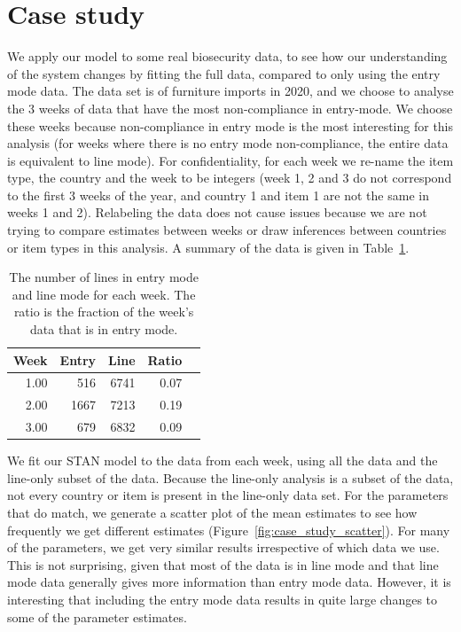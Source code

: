 \documentclass{article}
\begin{document}
\section{Case study}
We apply our model to some real biosecurity data, to see how our understanding of the system changes by fitting the full data, compared to only using the entry mode data. The data set is of furniture imports in 2020, and we choose to analyse the 3 weeks of data that have the most non-compliance in entry-mode. We choose these weeks because non-compliance in entry mode is the most interesting for this analysis (for weeks where there is no entry mode non-compliance, the entire data is equivalent to line mode). For confidentiality, for each week we re-name the item type, the country and the week to be integers (week 1, 2 and 3 do not correspond to the first 3 weeks of the year, and country 1 and item 1 are not the same in weeks 1 and 2). Relabeling the data does not cause issues because we are not trying to compare estimates between weeks or draw inferences between countries or item types in this analysis. A summary of the data is given in Table~\ref{tab:real_data_summary}.

\begin{table}[ht]
\caption{The number of lines in entry mode and line mode for each week. The ratio is the fraction of the week's data that is in entry mode.}
\label{tab:real_data_summary}
\centering
\begin{tabular}{rrrrr}
  \hline
 Week & Entry & Line & Ratio \\ 
  \hline
 1.00 & 516 & 6741 & 0.07 \\ 
  2.00 & 1667 & 7213 & 0.19 \\ 
   3.00 & 679 & 6832 & 0.09 \\ 
   \hline
\end{tabular}
\end{table}


We fit our STAN model to the data from each week, using all the data and the line-only subset of the data. Because the line-only analysis is a subset of the data, not every country or item is present in the line-only data set. For the parameters that do match, we generate a scatter plot of the mean estimates to see how frequently we get different estimates (Figure~\ref{fig:case_study_scatter}). For many of the parameters, we get very similar results irrespective of which data we use. This is not surprising, given that most of the data is in line mode and that line mode data generally gives more information than entry mode data. However, it is interesting that including the entry mode data results in quite large changes to some of the parameter estimates. 
\end{document}
